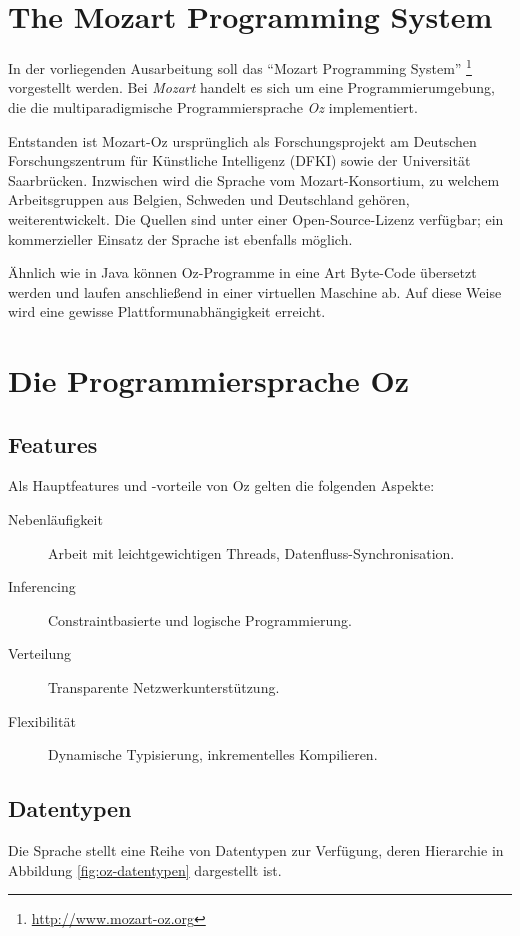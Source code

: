 \section{The Mozart Programming System}
In der vorliegenden Ausarbeitung soll das "`Mozart Programming System"'
\footnote{\url{http://www.mozart-oz.org}} 
vorgestellt werden. Bei \textsl{Mozart} handelt es sich um eine 
Programmierumgebung, die die multiparadigmische Programmiersprache \textsl{Oz} 
implementiert.

Entstanden ist Mozart-Oz ursprünglich als Forschungsprojekt am Deutschen 
Forschungszentrum für Künstliche Intelligenz (DFKI) sowie der Universität 
Saarbrücken. Inzwischen wird die Sprache vom Mozart-Konsortium, zu welchem 
Arbeitsgruppen aus Belgien, Schweden und Deutschland gehören, weiterentwickelt. 
Die Quellen sind unter einer Open-Source-Lizenz verfügbar; ein kommerzieller 
Einsatz der Sprache ist ebenfalls möglich.

Ähnlich wie in Java können Oz-Programme in eine Art Byte-Code übersetzt werden 
und laufen anschließend in einer virtuellen Maschine ab. Auf diese Weise wird 
eine gewisse Plattformunabhängigkeit erreicht.

\section{Die Programmiersprache Oz}
\subsection{Features}
Als Hauptfeatures und -vorteile von Oz gelten die folgenden Aspekte:

\begin{description}
  \item[Nebenläufigkeit] Arbeit mit leichtgewichtigen Threads, 
  Datenfluss-Synchronisation.
  \item[Inferencing] Constraintbasierte und 
  logische Programmierung.
  \item[Verteilung] Transparente 
  Netzwerkunterstützung.
  \item[Flexibilität] Dynamische Typisierung, inkrementelles 
  Kompilieren.
\end{description}

\subsection{Datentypen}
Die Sprache stellt eine Reihe von Datentypen zur Verfügung, deren Hierarchie in 
Abbildung \ref{fig:oz-datentypen} dargestellt ist.

